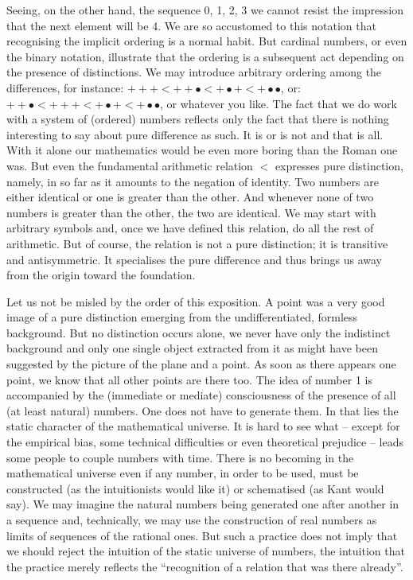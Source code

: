 Seeing, on the other hand, the sequence 0, 1, 2, 3 we cannot resist the impression that the next element will be 4. We are so accustomed to this notation that recognising the implicit ordering is a normal habit. But cardinal numbers, or even the binary notation, illustrate that the ordering is a subsequent act depending on the presence of distinctions. We may introduce arbitrary ordering among the differences, for instance: $+++ < ++\bullet< +\bullet+ < +\bullet\bullet$, or: 
$++\bullet < +++ < +\bullet+ < +\bullet\bullet$, or whatever you like. The fact that we do work with a system of (ordered) numbers reflects only the fact that there is nothing interesting to say about pure difference as such. It is or is not and that is all. With it alone our mathematics would be even more boring than the Roman one was. But even the fundamental arithmetic relation $<$ expresses pure distinction, namely, in so far as it amounts to the negation of identity. Two numbers are either identical or one is greater than the other. And whenever none of two numbers is greater than the other, the two are identical. We may start with arbitrary symbols and, once we have defined this relation, do all the rest of arithmetic. But of course, the relation is not a pure distinction; it is transitive and antisymmetric. It specialises the pure difference and thus brings us away from the origin toward the foundation.

Let us not be misled by the order of this exposition. A point was a very good image of a pure distinction emerging from the undifferentiated, formless background. But no distinction occurs alone, we never have only the indistinct background and only one single object extracted from it as might have been suggested by the picture of the plane and a point. As soon as there appears one point, we know that all other points are there too. The idea of number 1 is accompanied by the (immediate or mediate) consciousness of the presence of all (at least natural) numbers. One does not have to generate them. In that lies the static character of the mathematical universe. It is hard to see what -- except for the empirical bias, some technical difficulties or even theoretical prejudice -- leads some people to couple numbers with time. There is no becoming in the mathematical universe even if any number, in order to be used, must be constructed (as the intuitionists would like it) or schematised (as Kant would say). We may imagine the natural numbers being generated one after another in a sequence and, technically, we may use the construction of real numbers as limits of sequences of the rational ones. But such a practice does not imply that we should reject the intuition of the static universe of numbers, the intuition that the practice merely reflects the ``recognition of a relation that was there already''. 

